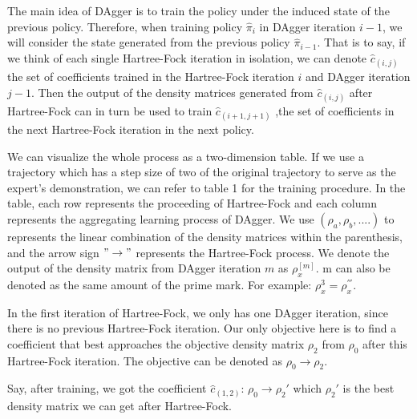 \documentclass[twoside]{article}
\begin{document}


The main idea of DAgger is to train the policy under the induced state of the previous policy. Therefore, when training policy $\hat{\pi}_{i}$ in DAgger iteration $i-1$,
we will consider the state generated from the previous policy $\hat{\pi}_{i-1}$. That is to say, if we think of each single Hartree-Fock iteration in isolation, we can denote $\hat{c}_{(i,j)}$ the set of coefficients trained in the Hartree-Fock iteration $i$ and DAgger iteration $j-1$. Then the output of the density matrices generated from $\hat{c}_{(i,j)}$ after Hartree-Fock can in turn be used to train $\hat{c}_{(i+1,j+1)}$ ,the set of coefficients in the next Hartree-Fock iteration in the next policy.



We can visualize the whole process as a two-dimension table. If we use a trajectory which has a step size of two of the original trajectory to serve as the expert's demonstration, we can refer to table 1 for the training procedure.
In the table, each row represents the proceeding of Hartree-Fock and each column represents the aggregating learning process of DAgger. We use $(\rho_a, \rho_b, ....)$ to represents the linear combination of the density matrices within the parenthesis, and the arrow sign $"\rightarrow"$ represents the Hartree-Fock process. We denote the output of the density matrix from DAgger iteration $m$ as $\rho_x^{[m]}$. m can also be denoted as the same amount of the prime mark. For example: $\rho_x^{3} = \rho_x^{'''}$.

In the first iteration of Hartree-Fock, we only has one DAgger iteration, since there is no previous Hartree-Fock iteration. Our only objective here is to find a coefficient that best approaches the objective density matrix $\rho_2$ from  $\rho_0$ after this Hartree-Fock iteration. The objective can be denoted as $\rho_0 \rightarrow \rho_2$. 

Say, after training, we got the coefficient $\hat{c}_{(1,2)}$: $\rho_0 \rightarrow \rho_{2}'$ which $\rho_2'$ is the best density matrix we can get after Hartree-Fock.
\end{document}
